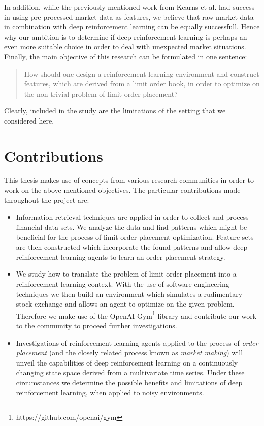 In addition, while the previously mentioned work from Kearns et al. had success in using pre-processed market data as features, we believe that raw market data in combination with deep reinforcement learning can be equally successfull.
Hence why our ambition is to determine if deep reinforcement learning is perhaps an even more suitable choice in order to deal with unexpected market situations.
Finally, the main objective of this research can be formulated in one sentence:
\begin{quote}
    How should one design a reinforcement learning environment and construct features, which are derived from a limit order book, in order to optimize on the non-trivial problem of limit order placement?
\end{quote}
Clearly, included in the study are the limitations of the setting that we considered here.

\section{Contributions}

This thesis makes use of concepts from various research communities in order to work on the above mentioned objectives.
The particular contributions made throughout the project are:
\begin{itemize}
    \item Information retrieval techniques are applied in order to collect and process financial data sets.
    We analyze the data and find patterns which might be beneficial for the process of limit order placement optimization.
    Feature sets are then constructed which incorporate the found patterns and allow deep reinforcement learning agents to learn an order placement strategy.
    \item We study how to translate the problem of limit order placement into a reinforcement learning context.
    With the use of software engineering techniques we then build an environment which simulates a rudimentary stock exchange and allows an agent to optimize on the given problem.
    Therefore we make use of the OpenAI Gym\footnote{https://github.com/openai/gym} library and contribute our work to the community to proceed further investigations.
    \item Investigations of reinforcement learning agents applied to the process of \textit{order placement} (and the closely related process known as \textit{market making}) will unveil the capabilities of deep reinforcement learning on a continuously changing state space derived from a multivariate time series.
    Under these circumstances we determine the possible benefits and limitations of deep reinforcement learning, when applied to noisy environments.
\end{itemize}

